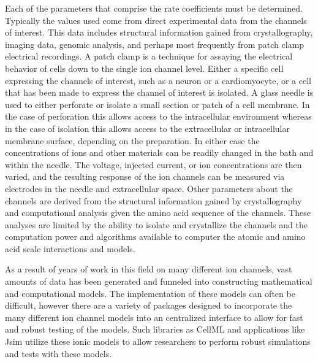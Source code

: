 \documentclass[12pt]{article}
\begin{document}
\par{}
Each of the parameters that comprise the rate coefficients must be determined. Typically the values used come from direct experimental data from the channels of interest. This data includes structural information gained from crystallography, imaging data, genomic analysis, and perhaps most frequently from patch clamp electrical recordings. A patch clamp is a technique for assaying the electrical behavior of cells down to the single ion channel level. Either a specific cell expressing the channels of interest, such as a neuron or a cardiomyocyte, or a cell that has been made to express the channel of interest is isolated. A glass needle is used to either perforate or isolate a small section or patch of a cell membrane. In the case of perforation this allows access to the intracellular environment whereas in the case of isolation this allows access to the extracellular or intracellular membrane surface, depending on the preparation. In either case the concentrations of ions and other materials can be readily changed in the bath and within the needle. The voltage, injected current, or ion concentrations are then varied, and the resulting response of the ion channels can be measured via electrodes in the needle and extracellular space. Other parameters about the channels are derived from the structural information gained by crystallography and computational analysis given the amino acid sequence of the channels. These analyses are limited by the ability to isolate and crystallize the channels and the computation power and algorithms available to computer the atomic and amino acid scale interactions and models.
\par{}
As a result of years of work in this field on many different ion channels, vast amounts of data has been generated and funneled into constructing mathematical and computational models. The implementation of these models can often be difficult, however there are a variety of packages designed to incorporate the many different ion channel models into an centralized interface to allow for fast and robust testing of the models. Such libraries as CellML and applications like Jsim utilize these ionic models to allow researchers to perform robust simulations and tests with these models.
\par{}
\end{document}
